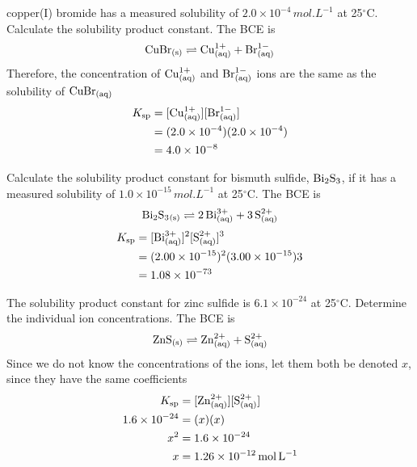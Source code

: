 \begin{sample}{copper(I) bromide has a measured solubility of $2.0\times10^{-4}\,\si{mol.L^{-1}}$
    at 25$^{\circ}$C. Calculate the solubility product constant.}
    The BCE is
    \[
        \ch{CuBr_{(s)}}\rightleftharpoons \ch{Cu^{1+}_{(aq)}}+\ch{Br^{1-}_{(aq)}}
    \]
    Therefore, the concentration of $\ch{Cu^{1+}_{(aq)}}$ and $\ch{Br^{1-}_{(aq)}}$ ions
    are the same as the solubility of $\ch{CuBr_{(aq)}}$
    \begin{align*}
        K_\mathrm{sp}&=[\ch{Cu^{1+}_{(aq)}}][\ch{Br^{1-}_{(aq)}}]\\
                     &=(2.0\times10^{-4})(2.0\times10^{-4})\\
                     &=4.0\times10^{-8}
    \end{align*}
\end{sample}

\begin{sample}{Calculate the solubility product constant for bismuth sulfide, $\ch{Bi2S3}$, if it
    has a measured solubility of $1.0\times10^{-15}\,\si{mol.L^{-1}}$ at 25$^{\circ}$C.}
    The BCE is
    \[
        \ch{Bi2S3_{(s)}}\rightleftharpoons \ch{2Bi^{3+}_{(aq)}}+\ch{3S^{2+}_{(aq)}}
    \]
    \begin{align*}
        K_\mathrm{sp}&=[\ch{Bi^{3+}_{(aq)}}]^2[\ch{S^{2+}_{(aq)}}]^3\\
                     &=(2.00\times10^{-15})^2(3.00\times10^{-15})3\\
                     &=1.08\times10^{-73}
    \end{align*}
\end{sample}

\begin{sample}{The solubility product constant for zinc sulfide is $6.1\times10^{-24}$ at 25$^{\circ}$C.
    Determine the individual ion concentrations.}
    The BCE is
    \[
        \ch{ZnS_{(s)}}\rightleftharpoons \ch{Zn^{2+}_{(aq)}}+\ch{S^{2+}_{(aq)}}
    \]
    Since we do not know the concentrations of the ions, let them both be denoted $x$, since they
    have the same coefficients
    \begin{align*}
        K_\mathrm{sp}&=[\ch{Zn^{2+}_{(aq)}}][\ch{S^{2+}_{(aq)}}]\\
        1.6\times10^{-24}&=(x)(x)\\
        x^2&=1.6\times10^{-24}\\
        x&=1.26\times10^{-12}\,\si{mol.L^{-1}}
    \end{align*}
\end{sample}

